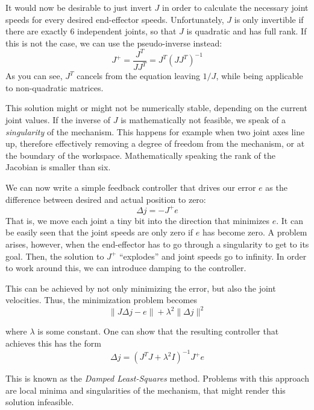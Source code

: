 It would now be desirable to just invert $J$ in order to calculate the necessary joint speeds for every desired end-effector speeds. Unfortunately, $ J$ is only invertible if there are exactly 6 independent joints, so that $ J$ is quadratic and has full rank. If this is not the case, we can use the pseudo-inverse instead:
\begin{equation}
J^+=\frac{J^T}{JJ^T}=J^T(JJ^T)^{-1}
\end{equation}
As you can see, $J^T$ cancels from the equation leaving $1/J$, while being applicable to non-quadratic matrices.

This solution might or might not be numerically stable, depending on the current joint values. If the inverse of $J$ is mathematically not feasible, we speak of a \emph{singularity} of the mechanism. This happens for example when two joint axes line up, therefore effectively removing a degree of freedom from the mechanism, or at the boundary of the workspace. Mathematically speaking the rank of the Jacobian is smaller than six.

We can now write a simple feedback controller that drives our error $e$ as the difference between desired and actual position to zero:
\begin{equation}
\Delta{j}=-J^+e
\end{equation}
That is, we move each joint a tiny bit into the direction that minimizes $e$.
It can be easily seen that the joint speeds are only zero if $e$ has become zero. A problem arises, however, when the end-effector has to go through a singularity to get to its goal. Then, the solution to $ J^+$ ``explodes'' and joint speeds go to infinity. In order to work around this, we can introduce damping to the controller.

This can be achieved by not only minimizing the error, but also the joint velocities. Thus, the minimization problem becomes
\begin{equation}
\|J\Delta j-e\|+\lambda^2\|\Delta j\|^2
\end{equation}

where $\lambda$ is some constant. One can show that the resulting controller that achieves this has the form
\begin{equation}
\Delta j=(J^TJ+\lambda^2 I)^{-1}J^+e
\end{equation}

This is known as the \emph{Damped Least-Squares} method. Problems with this approach are local minima and singularities of the mechanism, that might render this solution infeasible.

